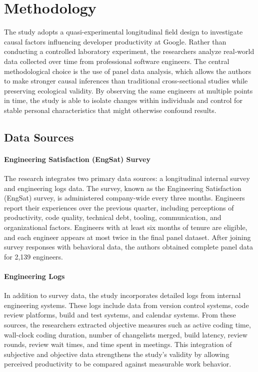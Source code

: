 \section{Methodology}
The study adopts a quasi-experimental longitudinal field design to investigate causal factors influencing developer productivity at Google. Rather than conducting a controlled laboratory experiment, the researchers analyze real-world data collected over time from professional software engineers. The central methodological choice is the use of panel data analysis, which allows the authors to make stronger causal inferences than traditional cross-sectional studies while preserving ecological validity. By observing the same engineers at multiple points in time, the study is able to isolate changes within individuals and control for stable personal characteristics that might otherwise confound results.

\subsection{Data Sources}
\paragraph{Engineering Satisfaction (EngSat) Survey} The research integrates two primary data sources: a longitudinal internal survey and engineering logs data. The survey, known as the Engineering Satisfaction (EngSat) survey, is administered company-wide every three months. Engineers report their experiences over the previous quarter, including perceptions of productivity, code quality, technical debt, tooling, communication, and organizational factors. Engineers with at least six months of tenure are eligible, and each engineer appears at most twice in the final panel dataset. After joining survey responses with behavioral data, the authors obtained complete panel data for 2,139 engineers.

\paragraph{Engineering Logs}In addition to survey data, the study incorporates detailed logs from internal engineering systems. These logs include data from version control systems, code review platforms, build and test systems, and calendar systems. From these sources, the researchers extracted objective measures such as active coding time, wall-clock coding duration, number of changelists merged, build latency, review rounds, review wait times, and time spent in meetings. This integration of subjective and objective data strengthens the study's validity by allowing perceived productivity to be compared against measurable work behavior.

